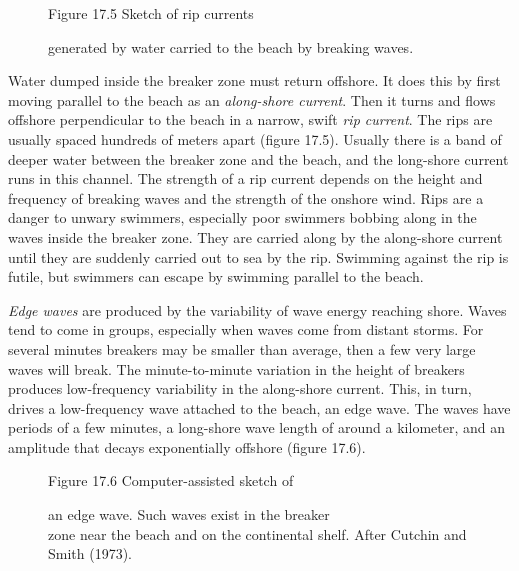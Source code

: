 \begin{figure}[b!]
\vspace{-2ex}
\centering
\footnotesize
Figure 17.5 Sketch of rip currents
\rule{0mm}{4ex}generated by water carried to the beach by breaking
waves.

\label{fig:rips}
\end{figure}

Water dumped inside the breaker zone must return offshore. It does this by first moving
parallel to the beach as an \textit{along-shore
  current}. Then it turns and flows
offshore perpendicular to the beach in a narrow, swift \textit{rip
  current}. The rips
are usually spaced hundreds of meters apart (figure 17.5). Usually
there is a band of deeper water between the breaker zone and the
beach, and the long-shore current runs in this channel. The strength
of a rip current depends on the height and
frequency of breaking waves and the strength of the onshore wind. Rips
are a danger to unwary swimmers, especially poor swimmers bobbing
along in the waves inside the breaker zone. They are carried along by
the along-shore current until they are suddenly carried out to sea by
the rip. Swimming against the rip is futile, but swimmers can escape
by swimming parallel to the beach.

\textit{Edge waves} are produced by the
variability of wave energy reaching shore. Waves tend to come in
groups, especially when waves come from distant storms. For several
minutes breakers may be smaller than
average, then a few very large waves will break. The minute-to-minute
variation in the height of breakers produces low-frequency variability
in the along-shore current. This, in turn, drives a low-frequency wave
attached to the beach, an edge wave. The waves have periods of a few
minutes, a long-shore wave length of around a kilometer, and an
amplitude that decays exponentially offshore (figure 17.6).

\begin{figure}[h!]
\vspace{-2ex}
\centering
\footnotesize
Figure 17.6 Computer-assisted sketch of \rule{0mm}{4ex}an edge
wave. Such waves exist in the breaker\\zone near the beach and on the
continental shelf. After Cutchin and Smith (1973).

\label{fig:edgewave}
\vspace{-4ex}
\end{figure}

